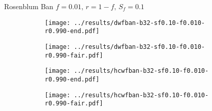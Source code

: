 \documentclass[10pt,a4paper]{beamer}
\begin{document}
%

	
	
	
\begin{frame}{Rosenblum Ban $f=0.01,\, r=1-f,\,S_f=0.1$}
	\begin{figure}
		\begin{subfigure}{.48\textwidth}
			\centering
			\texttt{[image: ../results/dwfban-b32-sf0.10-f0.010-r0.990-end.pdf]}
		\end{subfigure}
		\begin{subfigure}{.48\textwidth}
			\centering
			\texttt{[image: ../results/dwfban-b32-sf0.10-f0.010-r0.990-fair.pdf]}
		\end{subfigure}
	\end{figure}
	
	\begin{figure}
		\begin{subfigure}{.48\textwidth}
			\centering
			\texttt{[image: ../results/hcwfban-b32-sf0.10-f0.010-r0.990-end.pdf]}
		\end{subfigure}
		\begin{subfigure}{.48\textwidth}
			\centering
			\texttt{[image: ../results/hcwfban-b32-sf0.10-f0.010-r0.990-fair.pdf]}
		\end{subfigure}
	\end{figure}
\end{frame}
\end{document}

